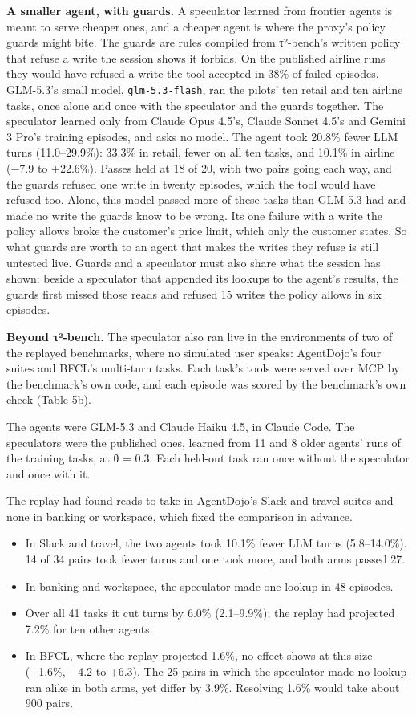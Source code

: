 \documentclass[10pt,twocolumn,letterpaper]{article}
\providecommand{\tightlist}{\setlength{\itemsep}{0pt}\setlength{\parskip}{0pt}}
\newcommand{\runin}[1]{{\sffamily\bfseries\color{accent}#1}}
\begin{document}
\runin{A smaller agent, with guards.} A speculator learned from frontier agents is meant to serve cheaper ones, and a cheaper agent is where the proxy's policy guards might bite. The guards are rules compiled from τ²-bench's written policy that refuse a write the session shows it forbids. On the published airline runs they would have refused a write the tool accepted in 38\% of failed episodes. GLM-5.3's small model, \texttt{glm-5.3-flash}, ran the pilots' ten retail and ten airline tasks, once alone and once with the speculator and the guards together. The speculator learned only from Claude Opus 4.5's, Claude Sonnet 4.5's and Gemini 3 Pro's training episodes, and asks no model. The agent took 20.8\% fewer LLM turns (11.0--29.9\%): 33.3\% in retail, fewer on all ten tasks, and 10.1\% in airline (−7.9 to +22.6\%). Passes held at 18 of 20, with two pairs going each way, and the guards refused one write in twenty episodes, which the tool would have refused too. Alone, this model passed more of these tasks than GLM-5.3 had and made no write the guards know to be wrong. Its one failure with a write the policy allows broke the customer's price limit, which only the customer states. So what guards are worth to an agent that makes the writes they refuse is still untested live. Guards and a speculator must also share what the session has shown: beside a speculator that appended its lookups to the agent's results, the guards first missed those reads and refused 15 writes the policy allows in six episodes.

\runin{Beyond τ²-bench.} The speculator also ran live in the environments of two of the replayed benchmarks, where no simulated user speaks: AgentDojo's four suites and BFCL's multi-turn tasks. Each task's tools were served over MCP by the benchmark's own code, and each episode was scored by the benchmark's own check (Table 5b).

The agents were GLM-5.3 and Claude Haiku 4.5, in Claude Code. The speculators were the published ones, learned from 11 and 8 older agents' runs of the training tasks, at θ = 0.3. Each held-out task ran once without the speculator and once with it.

The replay had found reads to take in AgentDojo's Slack and travel suites and none in banking or workspace, which fixed the comparison in advance.

\begin{itemize}
\tightlist
\item
  In Slack and travel, the two agents took 10.1\% fewer LLM turns (5.8--14.0\%). 14 of 34 pairs took fewer turns and one took more, and both arms passed 27.
\item
  In banking and workspace, the speculator made one lookup in 48 episodes.
\item
  Over all 41 tasks it cut turns by 6.0\% (2.1--9.9\%); the replay had projected 7.2\% for ten other agents.
\item
  In BFCL, where the replay projected 1.6\%, no effect shows at this size (+1.6\%, −4.2 to +6.3). The 25 pairs in which the speculator made no lookup ran alike in both arms, yet differ by 3.9\%. Resolving 1.6\% would take about 900 pairs.
\end{itemize}
\end{document}
